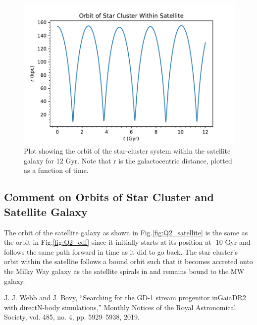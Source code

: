 \documentclass[apj]{emulateapj}
\begin{document}
\begin{figure}
    \centering
    \includegraphics[width=1.0\columnwidth]{Q2_sc.pdf}
    \caption{Plot showing the orbit of the star-cluster system within the satellite galaxy for 12 Gyr. Note that r is the galactocentric distance, plotted as a function of time.}
    \label{fig:Q2_star_cluster}
\end{figure}




\subsection{Comment on Orbits of Star Cluster and Satellite Galaxy}
The orbit of the satellite galaxy as shown in Fig.\ref{fig:Q2_satellite} is the same as the orbit in Fig.\ref{fig:Q2_cdf} since it initially starts at its position at -10 Gyr and follows the same path forward in time as it did to go back.
The star cluster's orbit within the satellite follows a bound orbit such that it becomes accreted onto the Milky Way galaxy as the satellite spirals in and remains bound to the MW galaxy.


\begin{thebibliography}{99}

J. J. Webb and J. Bovy, “Searching for the GD-1 stream progenitor inGaiaDR2 with directN-body simulations,” Monthly Notices of the Royal Astronomical Society, vol. 485, no. 4, pp. 5929–5938, 2019.



\end{thebibliography}
\end{document}

